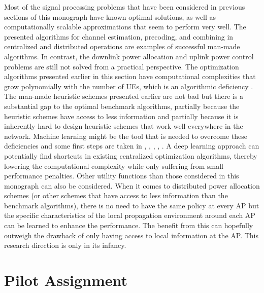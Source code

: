 \begin{remark}
Most of the signal processing problems that have been considered in previous sections of this monograph have known optimal solutions, as well as computationally scalable approximations that seem to perform very well. The presented algorithms for channel estimation, precoding, and combining in centralized and distributed operations are examples of successful man-made algorithms.
In contrast, the downlink power allocation and uplink power control problems are still not solved from a practical perspective. 
The optimization algorithms presented earlier in this section have computational complexities that grow polynomially with the number of UEs, which is an algorithmic deficiency \cite{Bjornson2020b}. The man-made heuristic schemes presented earlier are not bad but there is a substantial gap to the optimal benchmark algorithms, partially because the heuristic schemes have access to less information and partially because it is inherently hard to design heuristic schemes that work well everywhere in the network.
Machine learning might be the tool that is needed to overcome these deficiencies and some first steps are taken in \cite{Bashar2020c}, \cite{Chakraborty2019a}, \cite{Nikbakht2020b}, \cite{Yan2020a}, \cite{Zhao2020a}. A deep learning approach can potentially find shortcuts in existing centralized optimization algorithms, thereby lowering the computational complexity while only suffering from small performance penalties. Other utility functions than those considered in this monograph can also be considered.
When it comes to distributed power allocation schemes (or other schemes that have access to less information than the benchmark algorithms), there is no need to have the same policy at every AP but the specific characteristics of the local propagation environment around each AP can be learned to enhance the performance. The benefit from this can hopefully outweigh the drawback of only having access to local information at the AP.
This research direction is only in its infancy.
\end{remark}


\enlargethispage{\baselineskip}

\vspace{-2mm}
\section{Pilot Assignment}
\label{sec:pilot-assignment-advanced}



